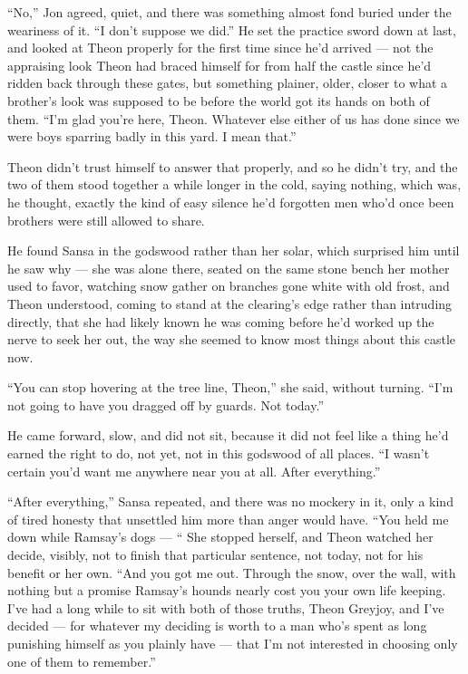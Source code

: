 “No,” Jon agreed, quiet, and there was something almost fond buried under the weariness of it. “I don’t suppose we did.” He set the practice sword down at last, and looked at Theon properly for the first time since he’d arrived — not the appraising look Theon had braced himself for from half the castle since he’d ridden back through these gates, but something plainer, older, closer to what a brother’s look was supposed to be before the world got its hands on both of them. “I’m glad you’re here, Theon. Whatever else either of us has done since we were boys sparring badly in this yard. I mean that.”

Theon didn’t trust himself to answer that properly, and so he didn’t try, and the two of them stood together a while longer in the cold, saying nothing, which was, he thought, exactly the kind of easy silence he’d forgotten men who’d once been brothers were still allowed to share.

\sceneBreak

He found Sansa in the godswood rather than her solar, which surprised him until he saw why — she was alone there, seated on the same stone bench her mother used to favor, watching snow gather on branches gone white with old frost, and Theon understood, coming to stand at the clearing’s edge rather than intruding directly, that she had likely known he was coming before he’d worked up the nerve to seek her out, the way she seemed to know most things about this castle now.

“You can stop hovering at the tree line, Theon,” she said, without turning. “I’m not going to have you dragged off by guards. Not today.”

He came forward, slow, and did not sit, because it did not feel like a thing he’d earned the right to do, not yet, not in this godswood of all places. “I wasn’t certain you’d want me anywhere near you at all. After everything.”

“After everything,” Sansa repeated, and there was no mockery in it, only a kind of tired honesty that unsettled him more than anger would have. “You held me down while Ramsay’s dogs — “ She stopped herself, and Theon watched her decide, visibly, not to finish that particular sentence, not today, not for his benefit or her own. “And you got me out. Through the snow, over the wall, with nothing but a promise Ramsay’s hounds nearly cost you your own life keeping. I’ve had a long while to sit with both of those truths, Theon Greyjoy, and I’ve decided — for whatever my deciding is worth to a man who’s spent as long punishing himself as you plainly have — that I’m not interested in choosing only one of them to remember.”

